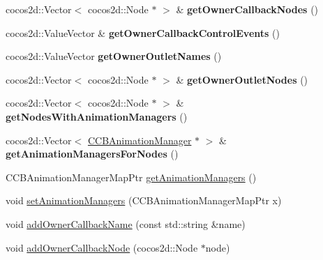 \begin{DoxyCompactItemize}
\mbox{\label{classcocosbuilder_1_1CCBReader_accb49580897fb631a045b7fe8954ed89}} 
cocos2d\+::\+Vector$<$ cocos2d\+::\+Node $\ast$ $>$ \& {\bfseries get\+Owner\+Callback\+Nodes} ()
\item 
\mbox{\label{classcocosbuilder_1_1CCBReader_adce15e045ef25585395beeb46f1776e3}} 
cocos2d\+::\+Value\+Vector \& {\bfseries get\+Owner\+Callback\+Control\+Events} ()
\item 
\mbox{\label{classcocosbuilder_1_1CCBReader_ac8af46f991e6218c50068da173653470}} 
cocos2d\+::\+Value\+Vector {\bfseries get\+Owner\+Outlet\+Names} ()
\item 
\mbox{\label{classcocosbuilder_1_1CCBReader_a632406f335e6749820219b0e51e41444}} 
cocos2d\+::\+Vector$<$ cocos2d\+::\+Node $\ast$ $>$ \& {\bfseries get\+Owner\+Outlet\+Nodes} ()
\item 
\mbox{\label{classcocosbuilder_1_1CCBReader_ac8261a1e57d42487584e3bb10698eb5c}} 
cocos2d\+::\+Vector$<$ cocos2d\+::\+Node $\ast$ $>$ \& {\bfseries get\+Nodes\+With\+Animation\+Managers} ()
\item 
\mbox{\label{classcocosbuilder_1_1CCBReader_ae912ec890cc879594f9fb46d85aa42b8}} 
cocos2d\+::\+Vector$<$ \hyperlink{classcocosbuilder_1_1CCBAnimationManager}{C\+C\+B\+Animation\+Manager} $\ast$ $>$ \& {\bfseries get\+Animation\+Managers\+For\+Nodes} ()
\item 
C\+C\+B\+Animation\+Manager\+Map\+Ptr \hyperlink{classcocosbuilder_1_1CCBReader_a0da8829af60a145f25d9496b4fd44534}{get\+Animation\+Managers} ()
\item 
void \hyperlink{classcocosbuilder_1_1CCBReader_adfce46f4628a398481896a7a6bd415be}{set\+Animation\+Managers} (C\+C\+B\+Animation\+Manager\+Map\+Ptr x)
\item 
void \hyperlink{classcocosbuilder_1_1CCBReader_a446402d89c52a9cd5f0ac017aeaafff0}{add\+Owner\+Callback\+Name} (const std\+::string \&name)
\item 
void \hyperlink{classcocosbuilder_1_1CCBReader_ae49813165f657e67e08253b86478d17c}{add\+Owner\+Callback\+Node} (cocos2d\+::\+Node $\ast$node)
\item 

\end{DoxyCompactItemize}
